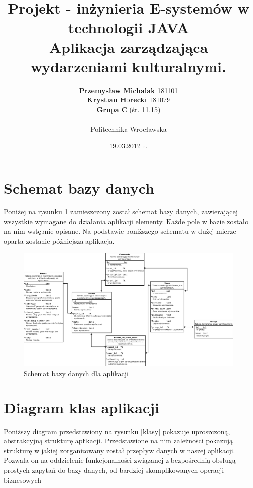 \documentclass[a4paper]{article}
\title{Projekt  - inżynieria E-systemów w technologii JAVA \\ Aplikacja zarządzająca wydarzeniami kulturalnymi.}
\author{\textbf{Przemysław Michalak} 181101\\ 
\textbf{Krystian Horecki} 181079 \\
\textbf{Grupa C} (śr. 11.15) \\ \\ Politechnika Wrocławska}
\date{19.03.2012 r.}
\begin{document}
\maketitle
\tableofcontents

\newpage

\section{Schemat bazy danych}
Poniżej na rysunku \ref{baza} zamieszczony został schemat bazy danych, zawierającej wszystkie wymagane do działania aplikacji
elementy.
Każde pole w bazie zostało na nim wstępnie opisane.
Na podstawie poniższego schematu w dużej mierze oparta zostanie późniejsza aplikacja.

\begin{figure}[!h]
\begin{center}
  \includegraphics[width=\textwidth]{baza.png}
  \caption{Schemat bazy danych dla aplikacji}
  \label{baza}
\end{center}
\end{figure}

\pagebreak
\section{Diagram klas aplikacji}
Poniższy diagram przedstawiony na rysunku \ref{klasy} pokazuje uproszczoną, abstrakcyjną strukturę aplikacji.
Przedstawione na nim zależności pokazują strukturę w jakiej zorganizowany został przepływ danych w naszej aplikacji.
Pozwala on na oddzielenie funkcjonalności związanej z bezpośrednią obsługą prostych zapytań do bazy danych, od bardziej skomplikowanych
operacji biznesowych.
\end{document}
